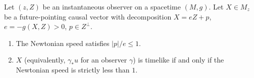 Let $(z, Z)$ be an instantaneous observer on a spacetime $(M, g)$. Let $X \in M_z$ be a future-pointing causal vector with decomposition $X = eZ + p$, $e = -g(X, Z) > 0$, $p \in Z^\perp$.

\begin{enumerate}
\item The Newtonian speed satisfies $|p|/e \leq 1$.
\item $X$ (equivalently, $\gamma_* u$ for an observer $\gamma$) is timelike if and only if the Newtonian speed is strictly less than $1$.
\end{enumerate}
